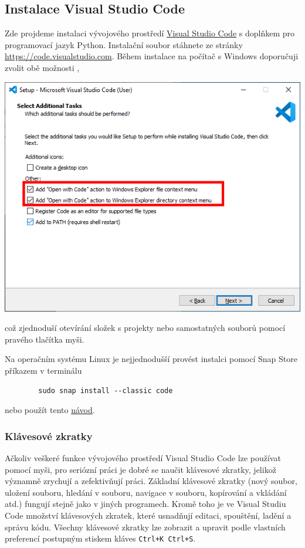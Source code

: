 \documentclass[a4paper,11pt,twoside]{article}
\def\code#1{\textnormal{\texttt{#1}}}
\theoremstyle{red}
\theoremstyle{green}
\begin{document}
\subsection{Instalace Visual Studio Code}
    Zde projdeme instalaci vývojového prostředí \href{https://code.visualstudio.com}{Visual Studio Code} s doplňkem pro programovací jazyk Python.
    Instalační soubor stáhnete ze stránky \url{https://code.visualstudio.com}.
    Během instalace na počítač s Windows doporučuji zvolit obě možnosti ,
    \begin{center}\includegraphics[width=0.5\linewidth]{VSCodeInstall.png}\end{center}
    což zjednoduší otevírání složek s projekty nebo samostatných souborů pomocí pravého tlačítka myši.

    Na operačním systému Linux je nejjednodušší provést instalci pomocí Snap Store příkazem v terminálu
    \begin{lstlisting}
        sudo snap install --classic code\end{lstlisting}
    nebo použít tento \href{https://code.visualstudio.com/docs/setup/linux}{návod}.
    
    \subsubsection{Klávesové zkratky}
    Ačkoliv veškeré funkce vývojového prostředí Visual Studio Code lze používat pomocí myši, pro seriózní práci je dobré se naučit klávesové zkratky, jelikož významně zrychují a zefektivňují práci.
    Základní klávesové zkratky (nový soubor, uložení souboru, hledání v souboru, navigace v souboru, kopírování a vkládání atd.) fungují stejně jako v jiných programech.
    Kromě toho je ve Visual Studiu Code množství klávesových zkratek, které usnadňují editaci, spouštění, ladění a správu kódu.
    Všechny klávesové zkratky lze zobrazit a upravit podle vlastních preferencí postupným stiskem kláves \code{Ctrl+K Ctrl+S}.
\end{document}
